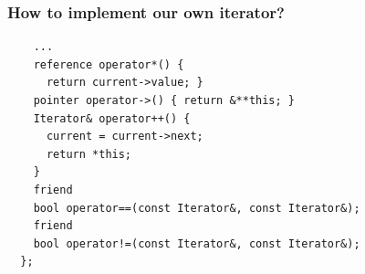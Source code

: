 \begin{frame}[fragile]
  \frametitle{How to implement our own iterator?}
\begin{lstlisting}
    ...
    reference operator*() {
      return current->value; }
    pointer operator->() { return &**this; }
    Iterator& operator++() {
      current = current->next;
      return *this;
    }
    friend
    bool operator==(const Iterator&, const Iterator&);
    friend
    bool operator!=(const Iterator&, const Iterator&);
  };
\end{lstlisting}
\end{frame}


